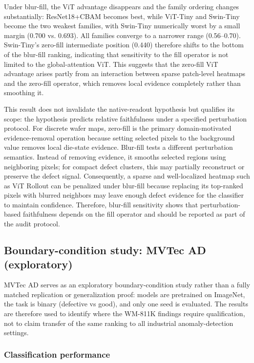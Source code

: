 \documentclass[11pt,a4paper]{article}
\begin{document}
Under blur-fill, the ViT advantage disappears and the family ordering changes substantially: ResNet18+CBAM becomes best, while ViT-Tiny and Swin-Tiny become the two weakest families, with Swin-Tiny numerically worst by a small margin (0.700 vs. 0.693). All families converge to a narrower range (0.56--0.70). Swin-Tiny's zero-fill intermediate position (0.440) therefore shifts to the bottom of the blur-fill ranking, indicating that sensitivity to the fill operator is not limited to the global-attention ViT. This suggests that the zero-fill ViT advantage arises partly from an interaction between sparse patch-level heatmaps and the zero-fill operator, which removes local evidence completely rather than smoothing it.

This result does not invalidate the native-readout hypothesis but qualifies its scope: the hypothesis predicts relative faithfulness under a specified perturbation protocol. For discrete wafer maps, zero-fill is the primary domain-motivated evidence-removal operation because setting selected pixels to the background value removes local die-state evidence. Blur-fill tests a different perturbation semantics. Instead of removing evidence, it smooths selected regions using neighboring pixels; for compact defect clusters, this may partially reconstruct or preserve the defect signal. Consequently, a sparse and well-localized heatmap such as ViT Rollout can be penalized under blur-fill because replacing its top-ranked pixels with blurred neighbors may leave enough defect evidence for the classifier to maintain confidence. Therefore, blur-fill sensitivity shows that perturbation-based
faithfulness depends on the fill operator and should be reported as part of the audit protocol.

\subsection{Boundary-condition study: MVTec AD (exploratory)}

MVTec AD serves as an exploratory boundary-condition study rather than a fully matched replication or generalization proof: models are pretrained on ImageNet, the task is binary (defective vs good), and only one seed is evaluated. The results are therefore used to identify where the WM-811K findings require qualification, not to claim transfer of the same ranking to all industrial anomaly-detection settings.

\subsubsection{Classification performance}
\end{document}
